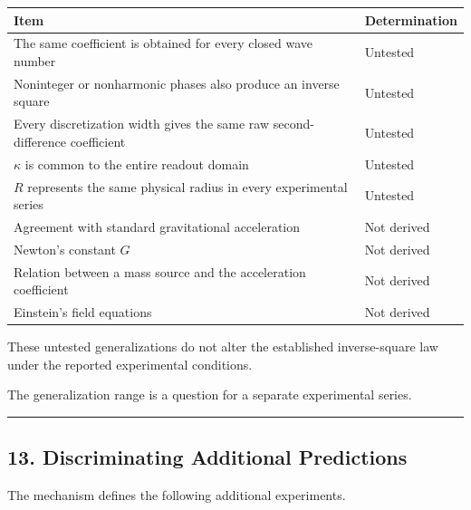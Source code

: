 \documentclass[
  10pt,
  a4paper,
]{article}
\newcounter{none} %
\begin{document}
{\def\LTcaptype{none} %
\begin{longtable}[]{@{}
  >{\raggedright\arraybackslash}p{}
  >{\raggedright\arraybackslash}p{}@{}}
\toprule\noalign{}
\begin{minipage}[b]{\linewidth}\raggedright
Item
\end{minipage} & \begin{minipage}[b]{\linewidth}\raggedright
Determination
\end{minipage} \\
\midrule\noalign{}
\endhead
\bottomrule\noalign{}
\endlastfoot
The same coefficient is obtained for every closed wave number &
Untested \\
Noninteger or nonharmonic phases also produce an inverse square &
Untested \\
Every discretization width gives the same raw second-difference
coefficient & Untested \\
\(\kappa\) is common to the entire readout domain & Untested \\
\(R\) represents the same physical radius in every experimental series &
Untested \\
Agreement with standard gravitational acceleration & Not derived \\
Newton's constant \(G\) & Not derived \\
Relation between a mass source and the acceleration coefficient & Not
derived \\
Einstein's field equations & Not derived \\
\end{longtable}
}

These untested generalizations do not alter the established
inverse-square law under the reported experimental conditions.

The generalization range is a question for a separate experimental
series.

\begin{center}\rule{0.5\linewidth}{0.5pt}\end{center}

\subsection{13. Discriminating Additional
Predictions}\label{discriminating-additional-predictions}

The mechanism defines the following additional experiments.
\end{document}
